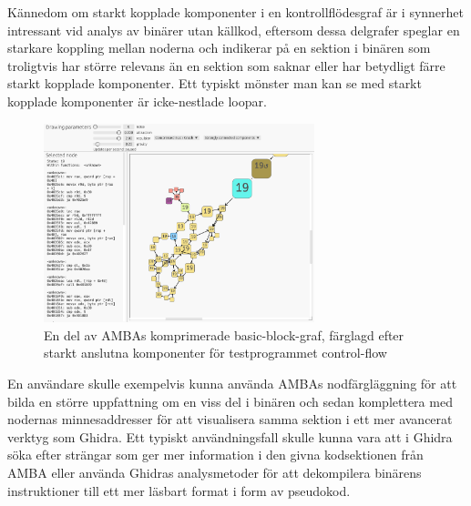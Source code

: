 Kännedom om starkt kopplade komponenter i en kontrollflödesgraf är i synnerhet
intressant vid analys av binärer utan källkod, eftersom dessa delgrafer speglar
en starkare koppling mellan noderna och indikerar på en sektion i binären som
troligtvis har större relevans än en sektion som saknar eller har betydligt
färre starkt kopplade komponenter. Ett typiskt mönster man kan se med starkt
kopplade komponenter är icke-nestlade loopar.

\begin{figure}
    \centering
    \includegraphics[width=0.7\textwidth]{figures/graph_scc.png}
    \caption{
        En del av AMBAs komprimerade basic-block-graf, färglagd efter starkt
        anslutna komponenter för testprogrammet control-flow
    }\label{fig:graf-scc}
\end{figure}

En användare skulle exempelvis kunna använda AMBAs nodfärgläggning för att bilda
en större uppfattning om en viss del i binären och sedan komplettera med
nodernas minnesaddresser för att visualisera samma sektion i ett mer avancerat
verktyg som Ghidra. Ett typiskt användningsfall skulle kunna vara att i Ghidra
söka efter strängar som ger mer information i den givna kodsektionen från AMBA
eller använda Ghidras analysmetoder för att dekompilera binärens instruktioner
till ett mer läsbart format i form av pseudokod.
